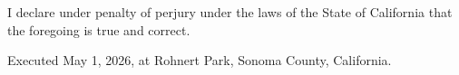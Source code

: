 I declare under penalty of perjury under the laws of the State of California that the foregoing is true and correct.\par
Executed May 1, 2026, at Rohnert Park, Sonoma County, California.\par
\vspace{0.2\baselineskip}


